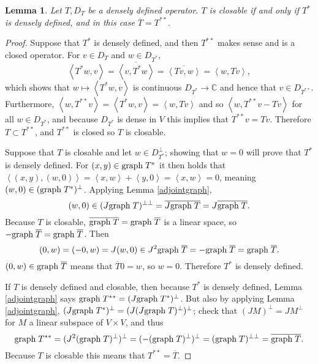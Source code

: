 \documentclass{article}
\newcommand{\inner}[2]{\left\langle #1, #2 \right\rangle}
\newcommand{\graph}{\ensuremath\mathrm{graph}\;}
\newtheorem{lemma}[theorem]{Lemma}
\theoremstyle{definition}
\begin{document}
\begin{lemma}
Let $T,D_T$ be a densely defined operator. $T$ is closable if and only if $T^*$
is densely defined, and in this case $\overline{T} = T^{**}$.
\end{lemma}
\begin{proof}
Suppose that $T^*$ is densely defined, and then $T^{**}$ makes sense and is a closed operator.
For $v \in D_T$ and $w \in D_{T^*}$,
\[
\inner{T^*w}{v} = \overline{\inner{v}{T^*w}} = \overline{\inner{Tv}{w}} = \inner{w}{Tv},
\]
which shows that $w \mapsto \inner{T^*w}{v}$ is continuous $D_{T^*} \to \mathbb{C}$ and hence that
$v \in D_{T^{**}}$. Furthermore, $\inner{w}{T^{**}v} = \inner{T^*w}{v} = \inner{w}{Tv}$ and so
$\inner{w}{T^{**}v-Tv}$ for all $w \in D_{T^*}$, and because $D_{T^*}$ is dense in $V$ this implies that
$T^{**}v=Tv$. Therefore $T \subset T^{**}$, and $T^{**}$ is closed so $T$ is closable.

Suppose that $T$ is closable and let
$w \in D_{T^*}^\perp$; showing that $w=0$ will prove that $T^*$ is densely defined. 
For $(x,y) \in \graph T^*$ it then holds that
$\inner{(x,y)}{(w,0)}=\inner{x}{w}+\inner{y}{0}=\inner{x}{w}=0$, meaning
$(w,0) \in (\graph T^*)^\perp$. Applying Lemma \ref{adjointgraph},
\[
(w,0) \in (J \graph T)^{\perp \perp} = \overline{J \graph T} = J \overline{\graph T}.
\] 
Because $T$ is closable, $\overline{\graph T} = \graph \overline{T}$ is a linear space, so
$-\graph \overline{T} = \graph \overline{T}$.
Then
\[
(0,w) = (-0,w) = J(w,0) \in J^2 \graph \overline{T} = -\graph \overline{T} = \graph \overline{T}.
\]
 $(0,w) \in \graph \overline{T}$ means that $\overline{T}0=w$, so $w=0$. Therefore $T^*$ is densely defined.
 
If $T$ is densely defined and closable, then because $T^*$ is densely defined, Lemma \ref{adjointgraph} says
$\graph T^{**} = (J \graph T^*)^\perp$. But also by applying Lemma \ref{adjointgraph},
$(J \graph T^*)^\perp = (J   (J \graph T)^\perp)^\perp$; check that $(JM)^\perp = JM^\perp$ for $M$ a linear subspace
of $V \times V$, and thus
\[
\graph T^{**} = (J^2 (\graph T)^\perp)^\perp
=(-(\graph T)^\perp)^\perp = (\graph T)^{\perp \perp}
=\overline{\graph T}.
\]
Because $T$ is closable this means that $T^{**}=\overline{T}$. 
\end{proof}
\end{document}
